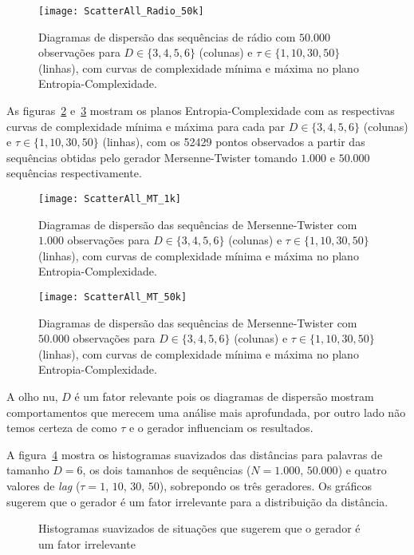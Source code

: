 \begin{figure}[hbt]
	\centering
	\texttt{[image: ScatterAll\_Radio\_50k]}
	\caption{Diagramas de dispersão das sequências de rádio com $50.000$ observações para $D\in\{3, 4, 5, 6\}$ (colunas) e $\tau\in\{1, 10, 30, 50\}$ (linhas), com curvas de complexidade mínima e máxima no plano Entropia-Complexidade.}\label{Fig:ScatterAll_Radio_50k}
\end{figure}

As figuras~\ref{Fig:ScatterAll_MT_1k} e~\ref{Fig:ScatterAll_MT_50k} mostram os planos Entropia-Complexidade com as respectivas curvas de complexidade mínima e máxima para cada par $D\in\{3, 4, 5, 6\}$ (colunas) e $\tau\in\{1, 10, 30, 50\}$ (linhas), com os \num{52429} pontos observados a partir das sequências obtidas pelo gerador Mersenne-Twister tomando $1.000$ e $50.000$ sequências respectivamente.

\begin{figure}[hbt]
	\centering
	\texttt{[image: ScatterAll\_MT\_1k]}
	\caption{Diagramas de dispersão das sequências de Mersenne-Twister com $1.000$ observações para $D\in\{3, 4, 5, 6\}$ (colunas) e $\tau\in\{1, 10, 30, 50\}$ (linhas), com curvas de complexidade mínima e máxima no plano Entropia-Complexidade.}\label{Fig:ScatterAll_MT_1k}
\end{figure}

\begin{figure}[hbt]
	\centering
	\texttt{[image: ScatterAll\_MT\_50k]}
	\caption{Diagramas de dispersão das sequências de Mersenne-Twister com $50.000$ observações para $D\in\{3,4,5,6\}$ (colunas) e $\tau\in\{1,10,30,50\}$ (linhas), com curvas de complexidade mínima e máxima no plano Entropia-Complexidade.}\label{Fig:ScatterAll_MT_50k}
\end{figure}

A olho nu, $D$ é um fator relevante pois os diagramas de dispersão mostram comportamentos que merecem uma análise mais aprofundada, por outro lado não temos certeza de como $\tau$ e o gerador influenciam os resultados. 

A figura~\ref{fig:GeradorIrrelevante} mostra os histogramas suavizados das distâncias para palavras de tamanho $D=6$, os dois tamanhos de sequências ($N=1.000$, $50.000$) e quatro valores de \textit{lag} ($\tau=1$, $10$, $30$, $50$), sobrepondo os três geradores.
Os gráficos sugerem que o gerador é um fator irrelevante para a distribuição da distância.

\begin{figure}
\centering
{}
\caption{Histogramas suavizados de situações que sugerem que o gerador é um fator irrelevante}\label{fig:GeradorIrrelevante}
\end{figure}

